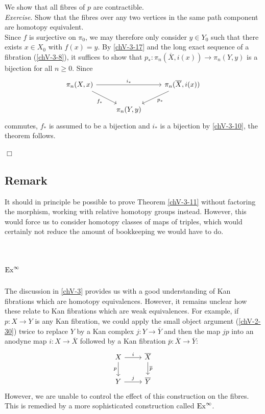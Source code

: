         We show that all fibres of $p$ are contractible.\\
        \emph{Exercise}. Show that the fibres over any two vertices in the same path component are homotopy equivalent.\\
        Since $f$ is surjective on $\pi_0$, we may therefore only consider $y \in Y_0$ such that there exists $x \in X_0$ with $f(x) = y$. By \ref{chV-3-17} and the long exact sequence of a fibration (\ref{chV-3-8}), it suffices to show that $p_{*} \colon \pi_n(\overline{X}, i(x)) \to \pi_n(Y, y)$ is a bijection for all $n \geq 0$. Since
        \begin{equation*}
            \begin{tikzcd}
                \pi_n(X, x) \arrow[rr, "i_{*}"] \arrow[dr, "f_{*}"'] & & \pi_n(\overline{X}, i(x)) \arrow[dl, "p_{*}"] \\
                & \pi_n(Y, y) &
            \end{tikzcd}
        \end{equation*}
        commutes, $f_{*}$ is assumed to be a bijection and $i_{*}$ is a bijection by \ref{chV-3-10}, the theorem follows.
        
        \quad\hfill$\Box$

    \subsection{Remark}\label{chV-3-19}
        It should in principle be possible to prove Theorem \ref{chV-3-11} without factoring the morphism, working with relative homotopy groups instead. However, this would force us to consider homotopy classes of maps of triples, which would certainly not reduce the amount of bookkeeping we would have to do.

\section[Ex]{$\operatorname{Ex}^{\infty}$}\label{chV-4}
    The discussion in \ref{chV-3} provides us with a good understanding of Kan fibrations which are homotopy equivalences. However, it remains unclear how these relate to Kan fibrations which are weak equivalences. For example, if $p \colon X \to Y$ is any Kan fibration, we could apply the small object argument (\ref{chV-2-30}) twice to replace $Y$ by a Kan complex $j \colon Y \to \overline{Y}$ and then the map $jp$ into an anodyne map $i \colon X \to \overline{X}$ followed by a Kan fibration $\overline{p} \colon \overline{X} \to \overline{Y}$:
    \begin{equation*}
        \begin{tikzcd}
            X \arrow[d, "p"'] \arrow[r, "i"] & \overline{X} \arrow[d, "\overline{p}"] \\
            Y \arrow[r, "j"] & \overline{Y}
        \end{tikzcd}
    \end{equation*}
    However, we are unable to control the effect of this construction on the fibres. This is remedied by a more sophisticated construction called $\operatorname{Ex}^{\infty}$.

